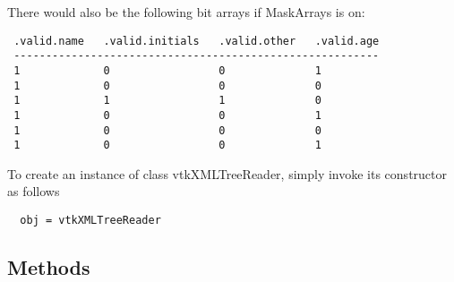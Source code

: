 There would also be the following bit arrays if MaskArrays is on:

 \begin{verbatim}
 .valid.name   .valid.initials   .valid.other   .valid.age
 ---------------------------------------------------------
 1             0                 0              1
 1             0                 0              0
 1             1                 1              0
 1             0                 0              1
 1             0                 0              0
 1             0                 0              1
 \end{verbatim}

To create an instance of class vtkXMLTreeReader, simply
invoke its constructor as follows
\begin{verbatim}
  obj = vtkXMLTreeReader
\end{verbatim}
\subsection{Methods}

